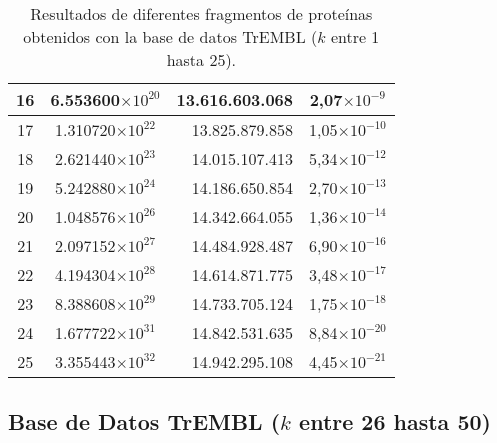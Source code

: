 \begin{table}[!hbt]
\begin{tabular}{| c  r  r  c |}
   16 & \multicolumn{1}{c}{6.553600$\times 10^{20}$} & 13.616.603.068 & 2,07$\times 10^{-9}$\\ \hline
   17 & \multicolumn{1}{c}{1.310720$\times 10^{22}$} & 13.825.879.858 & 1,05$\times 10^{-10}$\\ \hline
   18 & \multicolumn{1}{c}{2.621440$\times 10^{23}$} & 14.015.107.413 & 5,34$\times 10^{-12}$\\ \hline
   19 & \multicolumn{1}{c}{5.242880$\times 10^{24}$} & 14.186.650.854 & 2,70$\times 10^{-13}$\\ \hline
   20 & \multicolumn{1}{c}{1.048576$\times 10^{26}$} & 14.342.664.055 & 1,36$\times 10^{-14}$\\ \hline
   21 & \multicolumn{1}{c}{2.097152$\times 10^{27}$} & 14.484.928.487 & 6,90$\times 10^{-16}$\\ \hline
   22 & \multicolumn{1}{c}{4.194304$\times 10^{28}$} & 14.614.871.775 & 3,48$\times 10^{-17}$\\ \hline
   23 & \multicolumn{1}{c}{8.388608$\times 10^{29}$} & 14.733.705.124 & 1,75$\times 10^{-18}$\\ \hline
   24 & \multicolumn{1}{c}{1.677722$\times 10^{31}$} & 14.842.531.635 & 8,84$\times 10^{-20}$\\ \hline
   25 & \multicolumn{1}{c}{3.355443$\times 10^{32}$} & 14.942.295.108 & 4,45$\times 10^{-21}$\\ \hline
   \end{tabular}
   \caption{Resultados de diferentes fragmentos de proteínas obtenidos con la base de datos TrEMBL ($k$ entre 1 hasta 25).}
   \label{tb:labela21}
\end{table}

\newpage

\subsection*{Base de Datos TrEMBL ($k$ entre 26 hasta 50)}

